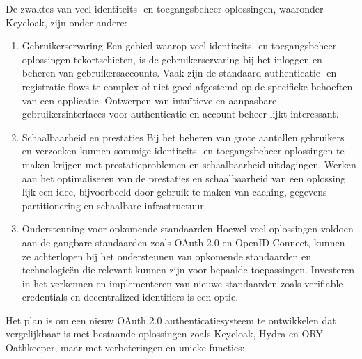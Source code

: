 De zwaktes van veel identiteits- en toegangsbeheer oplossingen, waaronder Keycloak, zijn onder andere:

\begin{enumerate}
  \item Gebruikerservaring
  Een gebied waarop veel identiteits- en toegangsbeheer oplossingen tekortschieten, is de gebruikerservaring bij het inloggen en beheren van gebruikersaccounts. Vaak zijn de standaard authenticatie- en registratie flows te complex of niet goed afgestemd op de specifieke behoeften van een applicatie. Ontwerpen van intuïtieve en aanpasbare gebruikersinterfaces voor authenticatie en account beheer lijkt interessant.
  
  \item Schaalbaarheid en prestaties
  Bij het beheren van grote aantallen gebruikers en verzoeken kunnen sommige identiteits- en toegangsbeheer oplossingen te maken krijgen met prestatieproblemen en schaalbaarheid uitdagingen. Werken aan het optimaliseren van de prestaties en schaalbaarheid van een oplossing lijk een idee, bijvoorbeeld door gebruik te maken van caching, gegevens partitionering en schaalbare infrastructuur.
  
  \item Ondersteuning voor opkomende standaarden
  Hoewel veel oplossingen voldoen aan de gangbare standaarden zoals OAuth 2.0 en OpenID Connect, kunnen ze achterlopen bij het ondersteunen van opkomende standaarden en technologieën die relevant kunnen zijn voor bepaalde toepassingen. Investeren in het verkennen en implementeren van nieuwe standaarden zoals verifiable credentials en decentralized identifiers is een optie.
\end{enumerate}

Het plan is om een nieuw OAuth 2.0 authenticatiesysteem te ontwikkelen dat vergelijkbaar is met bestaande oplossingen zoals Keycloak, Hydra en ORY Oathkeeper, maar met verbeteringen en unieke functies:

